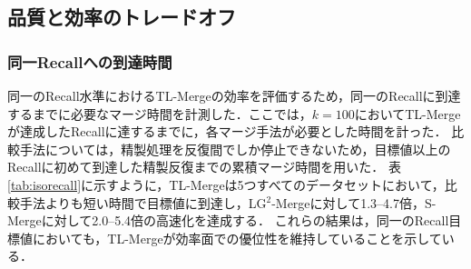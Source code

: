 \documentclass[submit,techrep,noauthor]{ipsj}
\newcommand{\meandist}{R_{\mathrm{dist}}}
\begin{document}
\subsection{品質と効率のトレードオフ}
\label{subsec:speed-quality}

\begin{table}[t]
    \centering
    \caption{$k=100$において，TL-Mergeが達成したRecall@100以上の精度に到達するまでのマージ時間[s]．括弧内はTL-Mergeの高速化率を示す．}
    \label{tab:isorecall}
	\vspace{2mm}
    \small
    \setlength{\tabcolsep}{4pt}
	
\end{table}

\subsubsection{同一Recallへの到達時間}
同一のRecall水準におけるTL-Mergeの効率を評価するため，同一のRecallに到達するまでに必要なマージ時間を計測した．ここでは，$k=100$においてTL-Mergeが達成したRecallに達するまでに，各マージ手法が必要とした時間を計った．
比較手法については，精製処理を反復間でしか停止できないため，目標値以上のRecallに初めて到達した精製反復までの累積マージ時間を用いた．
表\ref{tab:isorecall}に示すように，TL-Mergeは5つすべてのデータセットにおいて，比較手法よりも短い時間で目標値に到達し，LG$^2$-Mergeに対して1.3--4.7倍，S-Mergeに対して2.0--5.4倍の高速化を達成する．
これらの結果は，同一のRecall目標値においても，TL-Mergeが効率面での優位性を維持していることを示している．

\end{document}
